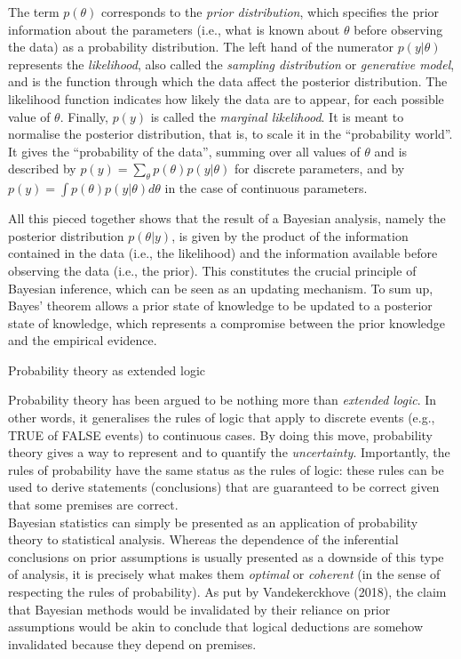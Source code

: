 \documentclass[a4paper,12pt,twoside,openright,oldfontcommands]{memoir}
\begin{document}
The term \(p(\theta)\) corresponds to the \emph{prior distribution},
which specifies the prior information about the parameters (i.e., what
is known about \(\theta\) before observing the data) as a probability
distribution. The left hand of the numerator \(p(y|\theta)\) represents
the \emph{likelihood}, also called the \emph{sampling distribution} or
\emph{generative model}, and is the function through which the data
affect the posterior distribution. The likelihood function indicates how
likely the data are to appear, for each possible value of \(\theta\).
Finally, \(p(y)\) is called the \emph{marginal likelihood}. It is meant
to normalise the posterior distribution, that is, to scale it in the
``probability world''. It gives the ``probability of the data'', summing
over all values of \(\theta\) and is described by
\(p(y) = \sum_{\theta} p(\theta) p(y|\theta)\) for discrete parameters,
and by \(p(y) = \int p(\theta) p(y|\theta) d\theta\) in the case of
continuous parameters.

All this pieced together shows that the result of a Bayesian analysis,
namely the posterior distribution \(p(\theta|y)\), is given by the
product of the information contained in the data (i.e., the likelihood)
and the information available before observing the data (i.e., the
prior). This constitutes the crucial principle of Bayesian inference,
which can be seen as an updating mechanism. To sum up, Bayes' theorem
allows a prior state of knowledge to be updated to a posterior state of
knowledge, which represents a compromise between the prior knowledge and
the empirical evidence.

\vspace{2mm}

\begin{mybox}[label = logic]{Probability theory as extended logic}

Probability theory has been argued to be nothing more than \textit{extended logic}. In other words, it generalises the rules of logic that apply to discrete events (e.g., TRUE of FALSE events) to continuous cases. By doing this move, probability theory gives a way to represent and to quantify the \textit{uncertainty}. Importantly, the rules of probability have the same status as the rules of logic: these rules can be used to derive statements (conclusions) that are guaranteed to be correct given that some premises are correct.\\

Bayesian statistics can simply be presented as an application of probability theory to statistical analysis. Whereas the dependence of the inferential conclusions on prior assumptions is usually presented as a downside of this type of analysis, it is precisely what makes them \textit{optimal} or \textit{coherent} (in the sense of respecting the rules of probability). As put by Vandekerckhove (2018), the claim that Bayesian methods would be invalidated by their reliance on prior assumptions would be akin to conclude that logical deductions are somehow invalidated because they depend on premises.\\

\end{mybox}
\end{document}
